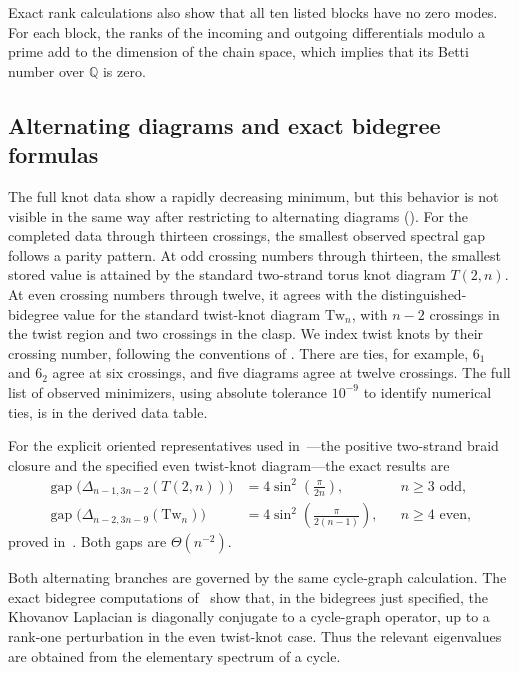 \documentclass[a4paper,onecolumn,unpublished]{quantumarticle}
\theoremstyle{plain}
\theoremstyle{definition}
\theoremstyle{definition}
\numberwithin{equation}{section}
\begin{document}
Exact rank calculations also show that all ten listed blocks have no zero
modes.  For each block, the ranks of the incoming and outgoing differentials
modulo a prime add to the dimension of the chain space, which implies that
its Betti number over $\mathbb Q$ is zero.

\subsection{Alternating diagrams and exact bidegree formulas}
\label{subsec:alternating_frontier}
The full knot data show a rapidly decreasing minimum, but this behavior is not
visible in the same way after restricting to alternating diagrams
(). For the completed data through
thirteen crossings, the smallest observed spectral gap follows a parity
pattern. At odd crossing numbers through
thirteen, the smallest stored value is attained by the standard two-strand torus
knot diagram $T(2,n)$.  At even crossing numbers through twelve, it agrees with
the distinguished-bidegree value for the standard twist-knot diagram
$\mathrm{Tw}_n$, with $n-2$ crossings in the twist region and two crossings in
the clasp. We index twist knots by their crossing number, following the
conventions of \cite[Definition~4.31]{GrljLaudaSpectralGeometry}. There are ties, for example, $6_1$ and $6_2$ agree at six
crossings, and five diagrams agree at twelve crossings.  The full list of
observed minimizers, using absolute tolerance $10^{-9}$ to identify numerical
ties, is in the derived data table.

For the explicit oriented representatives used
in~\cite[Sections~4.6--4.7]{GrljLaudaSpectralGeometry}---the positive two-strand
braid closure and the specified even twist-knot diagram---the exact results are
\begin{align}
\operatorname{gap}\bigl(\Delta_{n-1,3n-2}(T(2,n))\bigr)
  &=4\sin^2\!\left(\frac{\pi}{2n}\right), &&n\geq3\text{ odd},
\label{eq:torus_distinguished_gap}\\
\operatorname{gap}\bigl(\Delta_{n-2,3n-9}(\mathrm{Tw}_n)\bigr)
  &=4\sin^2\!\left(\frac{\pi}{2(n-1)}\right), &&n\geq4\text{ even},
\label{eq:alternating_distinguished_gaps}
\end{align}
proved in~\cite[Theorems~4.29 and~4.32]{GrljLaudaSpectralGeometry}.
Both gaps are $\Theta(n^{-2})$.

Both alternating branches are governed by the same cycle-graph calculation.
The exact bidegree computations of~\cite[proofs of Theorems~4.29 and~4.32]{GrljLaudaSpectralGeometry} show that,
in the bidegrees just specified, the Khovanov Laplacian is diagonally conjugate
to a cycle-graph operator, up to a rank-one perturbation in the even twist-knot
case. Thus the relevant eigenvalues are obtained from the elementary spectrum
of a cycle.
\end{document}
